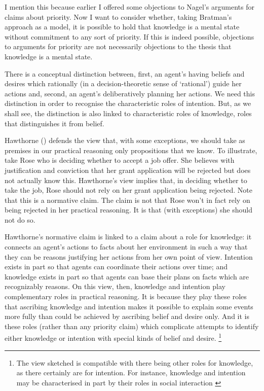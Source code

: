 \documentclass[11pt,a4paper]{extarticle}
\begin{document}
I mention this because  earlier I offered some objections to Nagel's arguments for claims about priority.
Now I want to
consider whether, taking Bratman's approach as a model,
it is possible to  hold that
 knowledge is a mental state 
without
commitment to any sort of priority.
If this is indeed possible, 
objections to arguments for priority 
are not necessarily
objections to the thesis that knowledge is a mental state.


There is a conceptual distinction between,
first,
an agent's having beliefs and desires which rationally 
(in a decision-theoretic sense of `rational') 
guide her actions
and,
second,
 an agent's deliberatively planning her actions.
We need this distinction in order to recognise the characteristic roles of intention.
But, as we shall see, the distinction is also linked to characteristic roles of knowledge, roles that distinguishes it from belief.

Hawthorne (\citeyear[pp.\ 29--31]{Hawthorne:2004ov}) defends the view that, with some exceptions, we should take as premises in our practical reasoning only propositions that we know.  
To illustrate, take Rose who is deciding whether to accept a job offer.
She believes with justification and conviction that her grant application will be rejected but does not actually know this.  
Hawthorne's view implies that, in deciding whether to take the job, Rose should not rely on her grant application being rejected.  
Note that this is a normative claim.  
The claim is not that Rose won't in fact rely on being rejected in her practical reasoning.  
It is that (with exceptions) she should not do so.  

Hawthorne's normative claim is linked to a claim about a role for knowledge: 
it connects an agent's actions to facts about her environment in such a way that they can be reasons justifying her actions from her own point of view.
Intention exists in part so that agents can coordinate their actions over time; 
and 
knowledge exists in part so that agents can base their plans on facts which are recognizably reasons.
On this view, then, knowledge and intention play complementary roles in practical reasoning.
It is because they play these roles that ascribing knowledge and intention makes it possible to explain some events more fully than could be achieved by ascribing belief and desire only.
And it is these roles 
(rather than any priority claim)
which complicate attempts to identify either knowledge or intention with special kinds of belief and desire.%
\footnote{
The view sketched is compatible with there being other roles for knowledge, as there certainly are for intention.
For instance, knowledge and intention may be characterised in part by their roles in social interaction 
\citep[cf.][]{Craig:1990wt,Bratman:2009lv}
}
\end{document}
